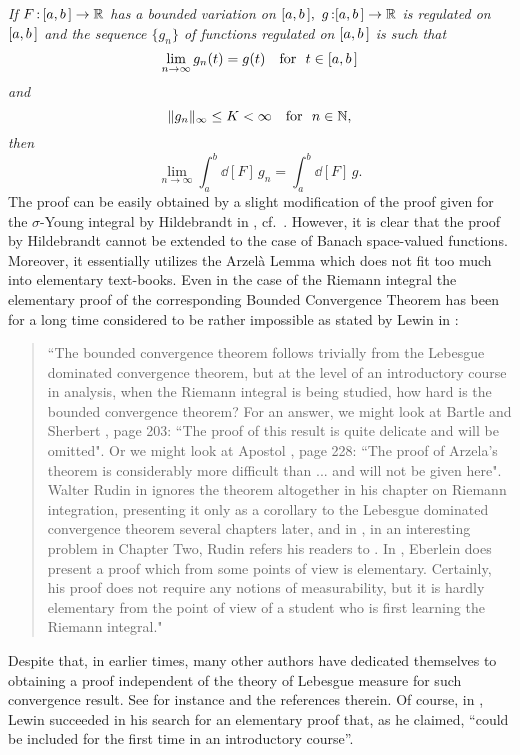 \documentclass[12pt,twoside]{article}
\numberwithin{equation}{section}
\theoremstyle{plain}
\theoremstyle{definition}
\begin{document}
{{\em If $F\,{:}\,[a,b\,]\to{\mathbb R}$ has a bounded variation on $[a,b\,],$  $g\,{:}[a,b\,]\to{\mathbb R}$ is
regulated on $[a,b\,]$ and the sequence $\{g_n\}$ of functions regulated on $[a,b\,]$
is such that
\[
   \lim_{n\to\infty}g_n(t)=g(t)\quad \mbox{for \ } t\in[a,b\,]
\]
and
\[
   \|g_n\|_\infty\le K<\infty \quad\mbox{for \ } n\in{\mathbb N},
\]
then}
\[
   \lim_{n\to\infty}\int_a^b\dd[F]\,g_n=\int_a^b\dd[F]\,g.
\]
The proof can be easily obtained by a slight modification of the proof given
for the $\sigma$-Young integral by Hildebrandt in \cite[Theorem II.19.3.14]{Hi},
cf.~\cite[Theorem I.4.24]{STV}. However, it is clear that the proof by Hildebrandt
cannot be extended to the case of Banach space-valued functions. Moreover, it
essentially utilizes the Arzel\`a Lemma which does not fit too much into elementary
text-books. Even in the case of the Riemann integral the elementary proof of
the corresponding Bounded Convergence Theorem has been for a long time considered
to be rather impossible as stated by Lewin in \cite{Lewin}:
\begin{quote}
``The bounded convergence theorem follows trivially from the Lebesgue dominated
convergence theorem, but at the level of an introductory course in analysis, when
the Riemann integral is being studied, how hard is the bounded convergence theorem?
For an answer, we might look at Bartle and Sherbert \cite{BaSh}, page 203:
``The proof of this result is quite delicate and will be omitted".
Or we might look at Apostol \cite{Apo}, page 228:
``The proof of Arzela's theorem is considerably more difficult than ... and will not
be given here".
Walter Rudin in \cite{Ru1} ignores the theorem altogether in his chapter on Riemann
integration, presenting it only as a corollary to the Lebesgue dominated
convergence theorem several chapters later, and in \cite{Ru2}, in an interesting
problem in Chapter Two, Rudin refers his readers to \cite{E}. In \cite{E},
Eberlein does present a proof which from some points of view is elementary. Certainly,
his proof does not require any notions of measurability, but it is hardly elementary
from the point of view of a student who is first learning the Riemann integral."
\end{quote}
Despite that, in earlier times, many other authors have dedicated themselves to obtaining
a proof independent of the theory of Lebesgue measure for such convergence result.
See for instance \cite{Lu}
and the references therein. Of course, in \cite{Lewin}, Lewin succeeded in his search
for an elementary proof that, as he claimed, ``could be included for the first time in
an introductory course''.

}
\end{document}
